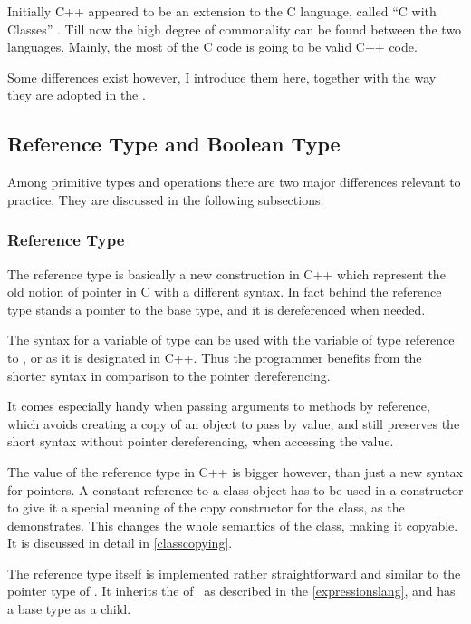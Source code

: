 
Initially C++ appeared to be an extension to the C language, called ``C with Classes'' \cite{cwithclasses}. Till now the high degree
of commonality can be found between the two languages. Mainly, the most of the C code is going to be valid C++ code. 

Some differences exist however, I introduce them here, together with the way they are adopted in the \pcpp.

\subsection{Reference Type and Boolean Type}

Among primitive types and operations there are two major differences relevant to practice.
They are discussed in the following subsections.

\subsubsection{Reference Type}

The reference type is basically a new construction in C++ which represent the old notion of pointer in C with a different syntax.
In fact behind the reference type stands a pointer to the base type, and it is dereferenced when needed. 

The syntax for a variable of type  can be used with the variable of type reference to , or  as it is designated in C++.
Thus the programmer benefits from the shorter syntax in comparison to the pointer dereferencing.

It comes especially handy when passing arguments to methods by reference, which avoids creating a copy of an object to pass by 
value, and still preserves the short syntax without pointer dereferencing, when accessing the value.


The value of the reference type in C++ is bigger however, than just a new syntax for pointers. A constant reference to a class object 
has to be used in a constructor to give it a special meaning of the copy constructor for the class, as the  demonstrates.
This changes the whole semantics of the class, making it copyable. It is discussed in detail in \ref{classcopying}.

The reference type itself is implemented rather straightforward and similar to the pointer type of \mbdr. It inherits the  
 of \mbdr\, as described in the \ref{expressionslang}, and has a base type as a child.


